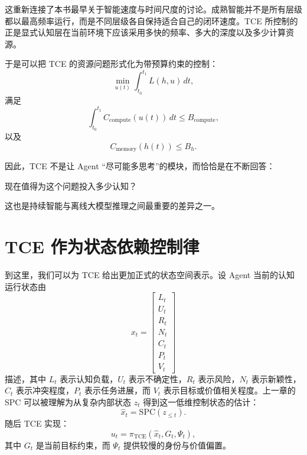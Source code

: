 这重新连接了本书最早关于智能速度与时间尺度的讨论。成熟智能并不是所有层级都以最高频率运行，而是不同层级各自保持适合自己的闭环速度。TCE 所控制的正是显式认知层在当前环境下应该采用多快的频率、多大的深度以及多少计算资源。

于是可以把 TCE 的资源问题形式化为带预算约束的控制：
\begin{equation}
    \min_{u(t)}
    \int_{t_0}^{t_1}
    L(h,u)\,dt,
\end{equation}
满足
\begin{equation}
    \int_{t_0}^{t_1}
    C_{\mathrm{compute}}(u(t))\,dt
    \le
    B_{\mathrm{compute}},
\end{equation}
以及
\begin{equation}
    C_{\mathrm{memory}}(h(t))
    \le
    B_h.
\end{equation}

因此，TCE 不是让 Agent “尽可能多思考”的模块，而恰恰是在不断回答：
\begin{statementbox}
现在值得为这个问题投入多少认知？
\end{statementbox}
这也是持续智能与离线大模型推理之间最重要的差异之一。

\section{TCE 作为状态依赖控制律}

到这里，我们可以为 TCE 给出更加正式的状态空间表示。设 Agent 当前的认知运行状态由
\begin{equation}
    x_t
    =
    \begin{bmatrix}
    L_t\\
    U_t\\
    R_t\\
    N_t\\
    C_t\\
    P_t\\
    V_t
    \end{bmatrix}
\end{equation}
描述，其中 $L_t$ 表示认知负载，$U_t$ 表示不确定性，$R_t$ 表示风险，$N_t$ 表示新颖性，$C_t$ 表示冲突程度，$P_t$ 表示任务进展，而 $V_t$ 表示目标或价值相关程度。上一章的 SPC 可以被理解为从复杂内部状态 $z_t$ 得到这一低维控制状态的估计：
\begin{equation}
    \hat x_t
    =
    \mathrm{SPC}(z_{\le t}).
\end{equation}
随后 TCE 实现：
\begin{equation}
    u_t
    =
    \pi_{\mathrm{TCE}}(\hat x_t,G_t,\Psi_t),
\end{equation}
其中 $G_t$ 是当前目标约束，而 $\Psi_t$ 提供较慢的身份与价值偏置。


